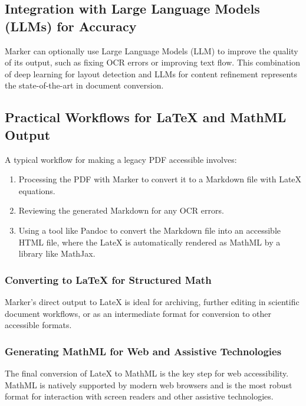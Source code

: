 \subsection{Integration with Large Language Models (LLMs) for Accuracy}\label{ch11:ssec:marker-llm}
Marker can optionally use Large Language Models (\gls{LLM}) to improve the quality of its output, such as fixing \gls{OCR} errors or improving text flow. This combination of deep learning for layout detection and \gls{LLM}s for content refinement represents the state-of-the-art in document conversion.

\subsection{Practical Workflows for LaTeX and MathML Output}\label{ch11:ssec:marker-workflows}
A typical workflow for making a legacy PDF accessible involves:
\begin{enumerate}
	\item Processing the PDF with Marker to convert it to a Markdown file with \gls{LateX} equations.
	\item Reviewing the generated Markdown for any \gls{OCR} errors.
	\item Using a tool like Pandoc to convert the Markdown file into an accessible HTML file, where the \gls{LateX} is automatically rendered as \gls{MathML} by a library like MathJax.
\end{enumerate}

\subsubsection{Converting to LaTeX for Structured Math}\label{ch11:sssec:marker-latex}
Marker's direct output to \gls{LateX} is ideal for archiving, further editing in scientific document workflows, or as an intermediate format for conversion to other accessible formats.

\subsubsection{Generating MathML for Web and Assistive Technologies}\label{ch11:sssec:marker-mathml}
The final conversion of \gls{LateX} to \gls{MathML} is the key step for web accessibility. \gls{MathML} is natively supported by modern web browsers and is the most robust format for interaction with screen readers and other assistive technologies.


